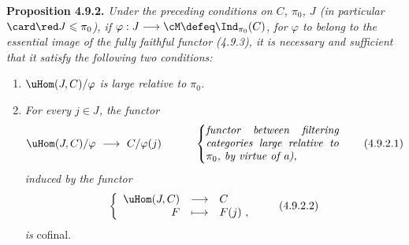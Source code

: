 \textbf{Proposition 4.9.2.} \textit{Under the preceding conditions on $C$, $\pi_0$, $J$ (in particular} $\card\red J \leqslant \pi_0$\textit{), if $\varphi : J \longrightarrow \cM \defeq \Ind_{\pi_0}(C)$, for $\varphi$ to belong to the essential image of the fully faithful functor (4.9.3), it is necessary and sufficient that it satisfy the following two conditions:}


\begin{enumerate}[leftmargin=*]
\item[\textit{a)}] $\uHom(J, C)/\varphi$ \textit{is large relative to $\pi_0$.}
\item[\textit{b)}] \textit{For every $j \in J$, the functor}
\[
\uHom(J, C)/\varphi \ \longrightarrow\ C/\varphi(j) \qquad\quad
\left\{
\parbox{0.35\textwidth}{\textit{functor between filtering categories large relative to $\pi_0$, by virtue of a),}}
\right. \tag*{(4.9.2.1)}
\]
\textit{induced by the functor}
\[
\left\{
\begin{array}{rcl}
\uHom(J, C) & \longrightarrow & C \\
F & \longmapsto & F(j)\ ,
\end{array}
\right. \tag*{(4.9.2.2)}
\]
\textit{is} cofinal.
\end{enumerate}
